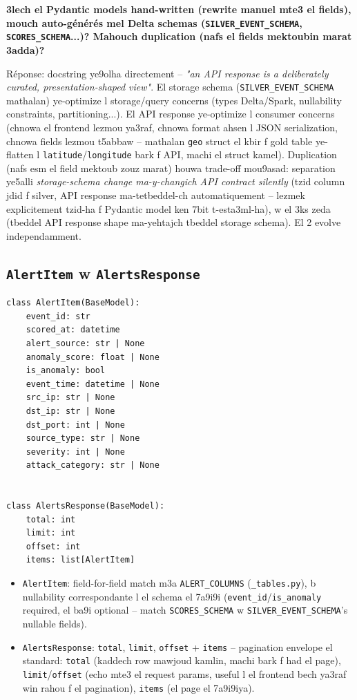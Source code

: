 \documentclass[11pt,a4paper]{report}
\DeclareRobustCommand{\code}[1]{\texttt{#1}}
\begin{document}
\begin{soual}
\textbf{3lech el Pydantic models hand-written (rewrite manuel mte3 el
fields), mouch auto-générés mel Delta schemas (\code{SILVER\_EVENT\_SCHEMA},
\code{SCORES\_SCHEMA}...)? Mahouch duplication (nafs el fields mektoubin
marat 3adda)?}

Réponse: docstring ye9olha directement -- \emph{"an API response is a
deliberately curated, presentation-shaped view"}. El storage schema
(\code{SILVER\_EVENT\_SCHEMA} mathalan) ye-optimize l storage/query
concerns (types Delta/Spark, nullability constraints, partitioning...).
El API response ye-optimize l consumer concerns (chnowa el frontend
lezmou ya3raf, chnowa format ahsen l JSON serialization, chnowa fields
lezmou t5abbaw -- mathalan \code{geo} struct el kbir f gold table ye-flatten
l \code{latitude}/\code{longitude} bark f API, machi el struct kamel).
Duplication (nafs esm el field mektoub zouz marat) houwa trade-off
mou9asad: separation ye5alli \emph{storage-schema change ma-y-changich
API contract silently} (tzid column jdid f silver, API response
ma-tetbeddel-ch automatiquement -- lezmek explicitement tzid-ha f
Pydantic model ken 7bit t-esta3ml-ha), w el 3ks zeda (tbeddel API response
shape ma-yehtajch tbeddel storage schema). El 2 evolve independamment.
\end{soual}

\subsection{\code{AlertItem} w \code{AlertsResponse}}

\begin{lstlisting}[style=pystyle]
class AlertItem(BaseModel):
    event_id: str
    scored_at: datetime
    alert_source: str | None
    anomaly_score: float | None
    is_anomaly: bool
    event_time: datetime | None
    src_ip: str | None
    dst_ip: str | None
    dst_port: int | None
    source_type: str | None
    severity: int | None
    attack_category: str | None


class AlertsResponse(BaseModel):
    total: int
    limit: int
    offset: int
    items: list[AlertItem]
\end{lstlisting}

\begin{itemize}
  \item \code{AlertItem}: field-for-field match m3a \code{ALERT\_COLUMNS}
        (\code{\_tables.py}), b nullability correspondante l el schema
        el 7a9i9i (\code{event\_id}/\code{is\_anomaly} required, el
        ba9i optional -- match \code{SCORES\_SCHEMA} w
        \code{SILVER\_EVENT\_SCHEMA}'s nullable fields).
  \item \code{AlertsResponse}: \code{total}, \code{limit}, \code{offset}
        + \code{items} -- pagination envelope el standard: \code{total}
        (kaddech row mawjoud kamlin, machi bark f had el page), \code{limit}/\code{offset}
        (echo mte3 el request params, useful l el frontend bech ya3raf
        win rahou f el pagination), \code{items} (el page el 7a9i9iya).
\end{itemize}
\end{document}

